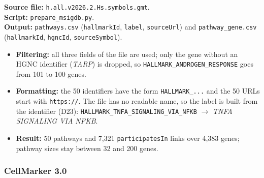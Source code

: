 {\raggedright \noindent\textbf{Source file:} \texttt{h.all.v2026.2.Hs.symbols.gmt}.\\ \textbf{Script:} \texttt{prepare\_msigdb.py}.\\ \textbf{Output:} \texttt{pathways.csv} (\texttt{hallmarkId}, \texttt{label}, \texttt{sourceUrl}) and \texttt{pathway\_gene.csv} (\texttt{hallmarkId}, \texttt{hgncId}, \texttt{sourceSymbol}).\par}
\begin{itemize}
    \item \textbf{Filtering:} all three fields of the file are used; only the gene without an HGNC identifier (\emph{TARP}) is dropped, so \texttt{HALLMARK\_ANDROGEN\_RESPONSE} goes from 101 to 100 genes.
    \item \textbf{Formatting:} the 50 identifiers have the form \texttt{HALLMARK\_...} and the 50 URLs start with \texttt{https://}. The file has no readable name, so the label is built from the identifier (D23): \texttt{HALLMARK\_TNFA\_SIGNALING\_VIA\_NFKB} $\rightarrow$ \emph{TNFA SIGNALING VIA NFKB}.
    \item \textbf{Result:} 50 pathways and 7,321 \texttt{participatesIn} links over 4,383 genes; pathway sizes stay between 32 and 200 genes.
\end{itemize}

\subsubsection{CellMarker 3.0}

